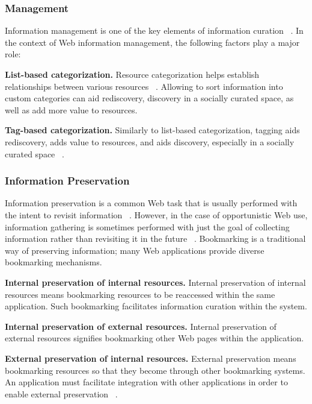 \documentclass{casconpaper}
\begin{document}
{{\subsubsection{Management}
Information management is one of the key elements of information curation ~\cite{beagrie, wittaker}. In the context of Web information management, the following factors play a major role:

\textbf{List-based categorization.} Resource categorization helps establish relationships between various resources ~\cite{beagrie, wittaker}. Allowing to sort information into custom categories can aid rediscovery, discovery in a socially curated space, as well as add more value to resources.

\textbf{Tag-based categorization.} Similarly to list-based categorization, tagging aids rediscovery, adds value to resources, and aids discovery, especially in a socially curated space ~\cite{gruber}.

} %

{\subsubsection{Information Preservation}
Information preservation is a common Web task that is usually performed with the intent to revisit information ~\cite{abrams, wittaker}. However, in the case of opportunistic Web use, information gathering is sometimes performed with just the goal of collecting information rather than revisiting it in the future ~\cite{lindley}. Bookmarking is a traditional way of preserving information; many Web applications provide diverse bookmarking mechanisms. 

\textbf{Internal preservation of internal resources.} Internal preservation of internal resources means bookmarking resources to be reaccessed within the same application. Such bookmarking facilitates information curation within the system.

\textbf{Internal preservation of external resources.} Internal preservation of external resources signifies bookmarking other Web pages within the application. 
  
\textbf{External preservation of internal resources.} External preservation means bookmarking resources so that they become through other bookmarking systems. An application must facilitate integration with other applications in order to enable external preservation ~\cite{abrams}.

} %

}
\end{document}
